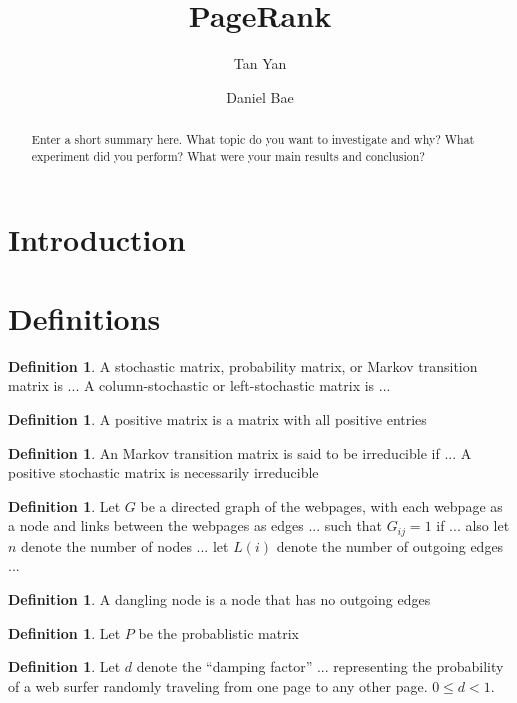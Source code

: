 \documentclass[11pt]{article}
\title{PageRank}
\author{Tan Yan \and Daniel Bae}
\theoremstyle{definition}
\newtheorem{definition}[theorem]{Definition}
\begin{document}
\maketitle
\begin{abstract}
Enter a short summary here. What topic do you want to investigate and why? What experiment did you perform? What were your main results and conclusion?
\end{abstract}

\section{Introduction}

\section{Definitions}
\begin{definition}
    A stochastic matrix, probability matrix, or Markov transition matrix is ...
    A column-stochastic or left-stochastic matrix is ...
\end{definition}

\begin{definition}
    A positive matrix is a matrix with all positive entries
\end{definition}

\begin{definition}
    An Markov transition matrix is said to be irreducible if ...
    A positive stochastic matrix is necessarily irreducible
\end{definition}

\begin{definition}
    Let $G$ be a directed graph of the webpages, with each webpage as a node and links between the webpages as edges ... such that $G_{ij} = 1$ if ...
    also let $n$ denote the number of nodes ...
    let $L(i)$ denote the number of outgoing edges ...
\end{definition}

\begin{definition}
    A dangling node is a node that has no outgoing edges
\end{definition}

\begin{definition}
    Let $P$ be the probablistic matrix 
\end{definition}

\begin{definition}
    Let $d$ denote the ``damping factor'' ... representing the probability of a web surfer randomly traveling from one page to any other page. $0 \leq d < 1$.
\end{definition}
\end{document}
